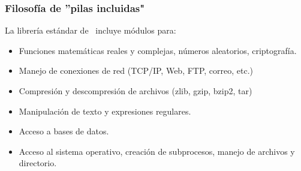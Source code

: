 \begin{frame}
\frametitle{Filosofía de ''pilas incluidas"}
La librería estándar de \python\ incluye módulos para:
\begin{itemize}
\item Funciones matemáticas reales y complejas, números aleatorios, criptografía.
\item Manejo de conexiones de red (TCP/IP, Web, FTP, correo, etc.)
\item Compresión y descompresión de archivos (zlib, gzip, bzip2, tar)
\item Manipulación de texto y expresiones regulares.
\item Acceso a bases de datos.
\item Acceso al sistema operativo, creación de subprocesos, manejo de archivos y directorio.
\end{itemize}
\end{frame}
